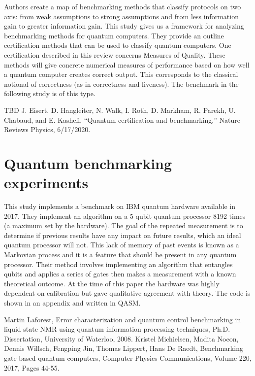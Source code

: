 \documentclass{article}
\begin{document}
Authors \cite{b8} create a map of benchmarking methods that classify protocols on two axis: from weak assumptions to strong assumptions and from less information gain to greater information gain. This study gives us a framework for analyzing benchmarking methods for quantum computers. They provide an outline certification methods that can be used to classify quantum computers. One certification described in this review concerns Measures of Quality. These methods will give concrete numerical measures of performance based on how well a quantum computer creates correct output. This corresponds to the classical notional of correctness (as in correctness and liveness). The benchmark in the following study \cite{b10} is of this type. 
\begin{thebibliography}{00}
    \makeatletter
    \addtocounter{\@listctr}{6}
    \makeatother
     TBD
     J. Eisert, D. Hangleiter, N. Walk, I. Roth, D. Markham, R. Parekh, U. Chabaud, and E. Kashefi, ``Quantum certification and benchmarking,'' Nature Reviews Physics, 6/17/2020.
\end{thebibliography}

\section{Quantum benchmarking experiments}
This study \cite{b10} implements a benchmark on IBM quantum hardware available in 2017. They implement an algorithm on a 5 qubit quantum processor 8192 times (a maximum set by the hardware). The goal of the repeated measurement is to determine if previous results have any impact on future results, which an ideal quantum processor will not. This lack of memory of past events is known as a Markovian process and it is a feature that should be present in any quantum processor. Their method involves implementing an algorithm that entangles qubits and applies a series of gates then makes a measurement with a known theoretical outcome. At the time of this paper the hardware was highly dependent on calibration but gave qualitative agreement with theory. The code is shown in an appendix and written in QASM.
\begin{thebibliography}{00}
\makeatletter
\addtocounter{\@listctr}{8}
\makeatother
{} Martin Laforest, Error characterization and quantum control benchmarking in liquid state NMR using quantum information processing techniques, Ph.D. Dissertation, University of Waterloo, 2008.
 Kristel Michielsen, Madita Nocon, Dennis Willsch, Fengping Jin, Thomas Lippert, Hans De Raedt, Benchmarking gate-based quantum computers, Computer Physics Communications, Volume 220, 2017, Pages 44-55.
\end{thebibliography}
\end{document}
